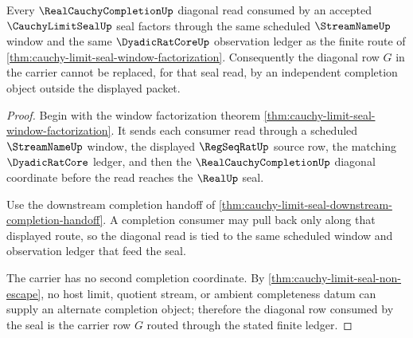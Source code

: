 \begin{theorem}
\label{thm:cauchy-limit-seal-diagonal-row-compatibility}
Every $\RealCauchyCompletionUp$ diagonal read consumed by an accepted $\CauchyLimitSealUp$ seal factors through the same scheduled $\StreamNameUp$ window and the same $\DyadicRatCoreUp$ observation ledger as the finite route of \autoref{thm:cauchy-limit-seal-window-factorization}. Consequently the diagonal row $G$ in the carrier cannot be replaced, for that seal read, by an independent completion object outside the displayed packet.
\end{theorem}
\begin{proof}
Begin with the window factorization theorem \autoref{thm:cauchy-limit-seal-window-factorization}. It sends each consumer read through a scheduled $\StreamNameUp$ window, the displayed $\RegSeqRatUp$ source row, the matching $\DyadicRatCore$ ledger, and then the $\RealCauchyCompletionUp$ diagonal coordinate before the read reaches the $\RealUp$ seal.

Use the downstream completion handoff of \autoref{thm:cauchy-limit-seal-downstream-completion-handoff}. A completion consumer may pull back only along that displayed route, so the diagonal read is tied to the same scheduled window and observation ledger that feed the seal.

The carrier has no second completion coordinate. By \autoref{thm:cauchy-limit-seal-non-escape}, no host limit, quotient stream, or ambient completeness datum can supply an alternate completion object; therefore the diagonal row consumed by the seal is the carrier row $G$ routed through the stated finite ledger.
\end{proof}

